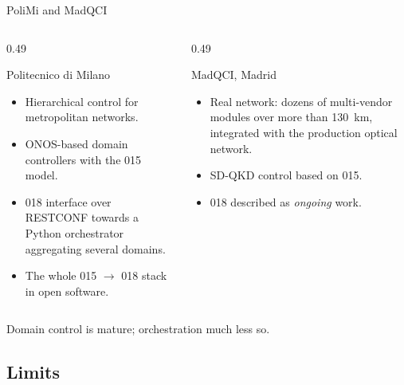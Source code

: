 \documentclass[10pt]{beamer}
\begin{document}
\begin{frame}{PoliMi and MadQCI}
  \begin{columns}[T]
    \begin{column}{0.49\textwidth}
      \begin{block}{Politecnico di Milano~\cite{vicario2025}}
        \small
        \begin{itemize}
          \item Hierarchical control for metropolitan networks.
          \item ONOS-based domain controllers with the 015 model.
          \item 018 interface over RESTCONF towards a Python orchestrator
                aggregating several domains.
          \item The whole 015 $\to$ 018 stack in open software.
        \end{itemize}
      \end{block}
    \end{column}
    \begin{column}{0.49\textwidth}
      \begin{block}{MadQCI, Madrid~\cite{madqci2024}}
        \small
        \begin{itemize}
          \item Real network: dozens of multi-vendor modules over more than
                130~km, integrated with the production optical network.
          \item SD-QKD control based on 015.
          \item 018 described as \emph{ongoing} work.
        \end{itemize}
      \end{block}
    \end{column}
  \end{columns}
  \vspace{2ex}
  \centering Domain control is mature; \alert{orchestration} much less so.
\end{frame}


\subsection{Limits}
\end{document}
